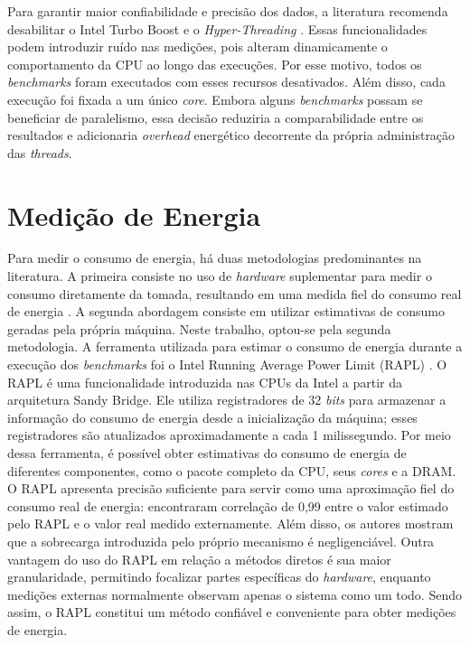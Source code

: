 Para garantir maior confiabilidade e precisão dos dados, a literatura recomenda
desabilitar o Intel Turbo Boost e o \textit{Hyper-Threading}
\cite{vms-hot-and-cold, steady-state-assessment}. Essas funcionalidades podem
introduzir ruído nas medições, pois alteram dinamicamente o comportamento da
CPU ao longo das execuções. Por esse motivo, todos os \textit{benchmarks}
foram executados com esses recursos desativados. Além disso, cada execução foi
fixada a um único \textit{core}. Embora alguns \textit{benchmarks} possam se
beneficiar de paralelismo, essa decisão reduziria a comparabilidade entre os
resultados e adicionaria \textit{overhead} energético decorrente da própria
administração das \textit{threads}.

\section{Medição de Energia}

Para medir o consumo de energia, há duas metodologias predominantes na
literatura. A primeira consiste no uso de \textit{hardware} suplementar para
medir o consumo diretamente da tomada, resultando em uma medida fiel do consumo
real de energia \cite{energy-java-collections-hasan}. A segunda abordagem
consiste em utilizar estimativas de consumo geradas pela própria máquina. Neste
trabalho, optou-se pela segunda metodologia. A ferramenta utilizada para
estimar o consumo de energia durante a execução dos \textit{benchmarks} foi o
Intel Running Average Power Limit (RAPL) \cite{rapl}. O RAPL é uma
funcionalidade introduzida nas CPUs da Intel a partir da arquitetura Sandy
Bridge. Ele utiliza registradores de 32 \textit{bits} para armazenar a
informação do consumo de energia desde a inicialização da máquina; esses
registradores são atualizados aproximadamente a cada 1 milissegundo. Por meio
dessa ferramenta, é possível obter estimativas do consumo de energia de
diferentes componentes, como o pacote completo da CPU, seus \textit{cores} e a
DRAM. O RAPL apresenta precisão suficiente para servir como uma aproximação
fiel do consumo real de energia:  encontraram
correlação de 0,99 entre o valor estimado pelo RAPL e o valor real medido
externamente. Além disso, os autores mostram que a sobrecarga introduzida pelo
próprio mecanismo é negligenciável. Outra vantagem do uso do RAPL em relação a
métodos diretos é sua maior granularidade, permitindo focalizar partes
específicas do \textit{hardware}, enquanto medições externas normalmente
observam apenas o sistema como um todo. Sendo assim, o RAPL constitui um método
confiável e conveniente para obter medições de energia.

